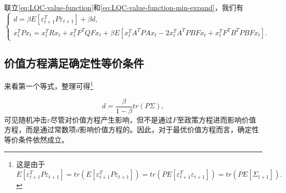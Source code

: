 联立\eqref{eq:LQC-value-function}和\eqref{eq:LQC-value-function-min-expand}，我们有
\begin{equation*}
\begin{cases}
  d = \beta E[\varepsilon_{t+1}^T P \varepsilon_{t+1}] + \beta d, \\
  x_t^T P x_t = x_t^T R x_t + x_t^T F^T Q F x_t + \beta E \left[
  x_t^T A^T P A x_t - 2 x_t^T A^T P B F x_t + x_t^T F^T B^T P B F x_t \right].
\end{cases}
\end{equation*}

\subsection{价值方程满足确定性等价条件}
\label{sec:LQC-value-function-certainty-equivalence}
来看第一个等式，整理可得\footnote{这是由于\begin{equation*}
E[\varepsilon_{t+1}^T P \varepsilon_{t+1}] = tr(E[\varepsilon_{t+1}^T P \varepsilon_{t+1}]) = tr(P E[\varepsilon_{t+1}^T \varepsilon_{t+1}]) = tr(P E[\Sigma_{t+1}]).
\end{equation*}}

\begin{equation}
  \label{eq:LQC-value-function-certainty-equivalence}
  d = \frac{\beta}{1-\beta} tr(P \Sigma),
\end{equation}
可见随机冲击$\varepsilon$尽管对价值方程产生影响，但不是通过$F$至政策方程进而影响价值方程，而是通过常数项$d$影响价值方程的。因此，对于最优价值方程而言，确定性等价条件依然成立。

